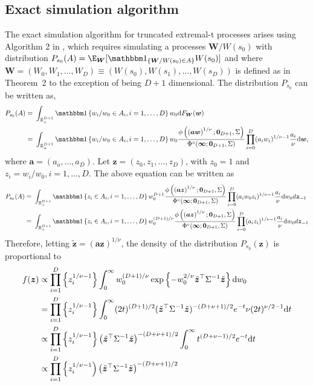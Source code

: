\documentclass[12pt]{article}
\begin{document}
\subsection{Exact simulation algorithm} 
The exact simulation algorithm for truncated extremal-t processes arises using Algorithm 2 in \cite{Dombry.Engelke.Oesting:2016}, which requires simulating a processes $\bm W/W(s_0)$ with distribution $P_{s_0}(A) = \E_{\bm W}[\mathbbm 1_{\{\bm W/W(s_0)\in A\}}W(s_0)]$ and where $\bm W = (W_0, W_1, \ldots, W_D) \equiv \left( W(s_0), W(s_1), \ldots, W(s_D)\right)$ is defined as in Theorem~2 to the exception of being $D+1$ dimensional. The distribution $P_{s_0}$ can be written as,
\begin{align*}
	P_{s_0}(A) =&\ \int_{\mathbb{R}_+^{D+1}} \mathbbm 1 \left\{w_i/w_0 \in A_i, i=1,\dots,D  \right\} w_0 \text dF_{\bm W}(\bm w)  \\
	=&\ \int_{\mathbb{R}_+^{D+1}} \mathbbm 1 \left\{ w_i/w_0 \in A_i, i=1,\dots,D \right\} w_0 \frac{\phi\left(\left( \bm a \bm w\right)^{1/\nu};\bm 0_{D+1},\Sigma\right)}{\Phi^\circ(\bm \infty; \bm 0_{D+1}, \Sigma)} \prod_{i=0}^D(a_i w_i)^{1/\nu-1} \frac{a_i}{\nu} \text d \bm w,
\end{align*}  	
where $\bm a = (a_o, \ldots, a_D)$.
Let $\bm z = (z_0, z_1, \ldots, z_D)$, with $z_0 = 1$ and $z_i = w_i/w_0, i=1, \ldots, D$. The above equation can be written as
%
\begin{align*}
P_{s_0}(A) =&\ \int_{\mathbb{R}_+^{D+1}} \mathbbm 1 \left\{z_i \in A_i, i=1,\dots,D\right\} w_0^{D+1} 
\frac{\phi\left(\left( \bm a \bm z\right)^{1/\nu};\bm 0_{D+1},\Sigma\right)}{\Phi^\circ(\bm \infty; \bm 0_{D+1}, \Sigma)} \prod_{i=0}^D(a_i w_0 z_i)^{1/\nu-1} \frac{a_i}{\nu} \text dw_0 d \bm z_{-1}\\
=&\ \int_{\mathbb{R}_+^{D+1}} \mathbbm 1 \left\{ z_i \in A_i, i=1,\dots,D\right\} w_0^{(D+1)/\nu} \frac{\phi\left(\left( \bm a \bm z\right)^{1/\nu};\bm 0_{D+1},\Sigma\right)}{\Phi^\circ(\bm \infty; \bm 0_{D+1}, \Sigma)} \prod_{i=0}^D(a_i z_i)^{1/\nu-1} \frac{a_i}{\nu} \text dw_0 d \bm z_{-1}\\
\end{align*}
%
Therefore, letting $\tilde{\bm z} = ( \bm a \bm z)^{1/\nu}$, the density of the distribution $P_{s_0}(\bm z)$ is proportional to 
\begin{align*}
f(\bm z) & \propto \prod_{i=1}^D \left\{ z_i^{1/\nu-1}\right\}
 \int_{0}^{\infty} w_0^{(D+1)/\nu} \exp\left\{- w_0^{2/\nu} \tilde{\bm z}^\top \Sigma^{-1} \tilde{\bm z} \right\} \text dw_0 \\
	&= \prod_{i=1}^D \left\{ z_i^{1/\nu-1} \right\}
 \int_{0}^{\infty} (2t)^{(D+1)/2} (\tilde{\bm z}^\top \Sigma^{-1} \tilde{\bm z})^{-(D+\nu+1)/2} e^{-t} \nu (2t)^{\nu/2-1} \text dt \\
	& \propto  \prod_{i=1}^D \left\{ z_i^{1/\nu-1}\right\}  \left(\tilde{\bm z}^\top \Sigma^{-1} \tilde{\bm z}\right)^{-(D+\nu+1)/2} \int_{0}^{\infty} t^{(D+\nu-1)/2} e^{-t} \text dt \\
	&\propto \prod_{i=1}^D \left\{z_i^{1/\nu-1}\right) \left(\tilde{\bm z}^\top \Sigma^{-1}\tilde{\bm z}\right)^{-(D+\nu+1)/2}
\end{align*}
\end{document}
